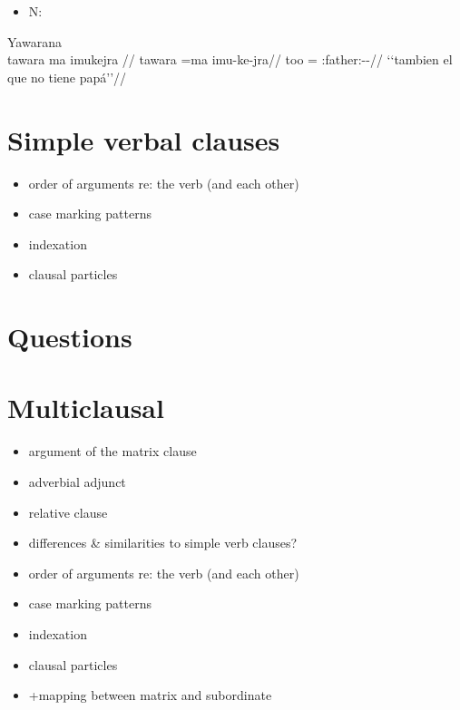 \documentclass{memoir}
\begin{document}
\begin{itemize}
\tightlist
\item
  N:
\end{itemize}

\ex Yawarana \\
\label{hist2mape-58}    \begingl
    \glpreamble tawara ma imukejra //
    \gla tawara =ma imu-ke-jra//
    \glb too = :father:--//
        \glft ‘‘tambien el que no tiene papá’’//  
    \endgl 
\xe

\chapter{\texorpdfstring{Simple verbal clauses
\label{simpleverb}}{Simple verbal clauses }}


\begin{itemize}
\tightlist
\item
  order of arguments re: the verb (and each other)
\item
  case marking patterns
\item
  indexation
\item
  clausal particles
\end{itemize}

\chapter{\texorpdfstring{Questions \label{questions}}{Questions }}

\chapter{\texorpdfstring{Multiclausal
\label{multiclausal}}{Multiclausal }}

\begin{itemize}
\item
  argument of the matrix clause
\item
  adverbial adjunct
\item
  relative clause
\item
  differences \& similarities to simple verb clauses?
\item
  order of arguments re: the verb (and each other)
\item
  case marking patterns
\item
  indexation
\item
  clausal particles
\item
  +mapping between matrix and subordinate
\end{itemize}
\end{document}
